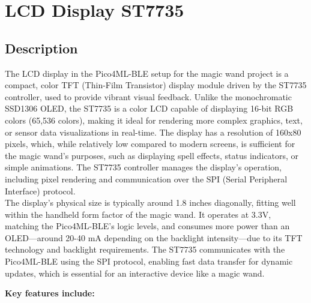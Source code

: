 %
%







\chapter{LCD Display ST7735}

\section{Description}

The LCD display in the Pico4ML-BLE setup for the magic wand project is a compact, color TFT (Thin-Film Transistor) display module driven by the ST7735 controller, used to provide vibrant visual feedback. Unlike the monochromatic SSD1306 OLED, the ST7735 is a color LCD capable of displaying 16-bit RGB colors (65,536 colors), making it ideal for rendering more complex graphics, text, or sensor data visualizations in real-time. The display has a resolution of 160x80 pixels, which, while relatively low compared to modern screens, is sufficient for the magic wand's purposes, such as displaying spell effects, status indicators, or simple animations. The ST7735 controller manages the display's operation, including pixel rendering and communication over the SPI (Serial Peripheral Interface) protocol.\\



The display's physical size is typically around 1.8 inches diagonally, fitting well within the handheld form factor of the magic wand. It operates at 3.3V, matching the Pico4ML-BLE's logic levels, and consumes more power than an OLED---around 20-40 mA depending on the backlight intensity---due to its TFT technology and backlight requirements. The ST7735 communicates with the Pico4ML-BLE using the SPI protocol, enabling fast data transfer for dynamic updates, which is essential for an interactive device like a magic wand.\cite{Sitronix:2010}



\textbf{Key features include:}

